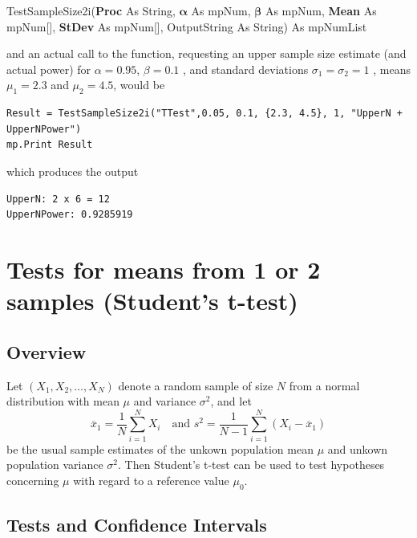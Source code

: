\vspace{0.3cm}
\textsf{TestSampleSize2i(\textbf{Proc} As String, $\boldsymbol{\alpha}$ As mpNum, $\boldsymbol{\beta}$ As mpNum, \textbf{Mean} As mpNum[], \textbf{StDev} As mpNum[], OutputString As String) As mpNumList}

\vspace{0.3cm}
and an actual call to the function, requesting an upper sample size estimate (and actual power) for $\alpha = 0.95$, $\beta=0.1$ , and standard deviations $\sigma_1=\sigma_2=1$ , means $\mu_1=2.3$ and $\mu_2=4.5$,   would be

\begin{lstlisting}
Result = TestSampleSize2i("TTest",0.05, 0.1, {2.3, 4.5}, 1, "UpperN + UpperNPower")
mp.Print Result
\end{lstlisting}
which produces the output

\begin{verbatim}
UpperN: 2 x 6 = 12
UpperNPower: 0.9285919
\end{verbatim}


\newpage
\section{Tests for means from 1 or 2 samples (Student's t-test)}
\label{1SampleTTest}

\subsection{Overview}
\label{1SampleTTestOverview}

Let $(X_1, X_2, \ldots, X_N)$ denote a random sample of size $N$ from a normal distribution with mean $\mu$ and variance $\sigma^2$, and let
\begin{equation}
	\overline{x}_1 = \frac{1}{N} \sum_{i=1}^N X_i \quad \text{and } s^2 = \frac{1}{N-1} \sum_{i=1}^N (X_i - \overline{x}_1)
\end{equation}
be the usual sample estimates of the unkown population mean $\mu$ and unkown population variance $\sigma^2$. Then Student's t-test can be used to test hypotheses concerning $\mu$ with regard to a reference value $\mu_0$.



\subsection{Tests and Confidence Intervals}

